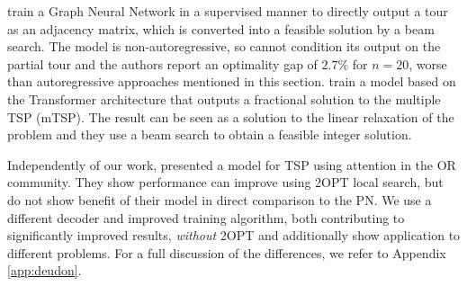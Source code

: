 \citet{nowak2017note} train a Graph Neural Network in a supervised manner to directly output a tour as an adjacency matrix, which is converted into a feasible solution by a beam search. The model is non-autoregressive, so cannot condition its output on the partial tour and the authors report an optimality gap of $2.7 \%$ for $n = 20$, worse than autoregressive approaches mentioned in this section. \citet{kaempfer2018learning} train a model based on the Transformer architecture \citep{vaswani2017attention} that outputs a fractional solution to the multiple TSP (mTSP). The result can be seen as a solution to the linear relaxation of the problem and they use a beam search to obtain a feasible integer solution. 

Independently of our work, \citet{deudon2018learning} presented a model for TSP using attention in the OR community. They show performance can improve using 2OPT local search, but do not show benefit of their model in direct comparison to the PN. We use a different decoder and improved training algorithm, both contributing to significantly improved results, \emph{without} 2OPT and additionally show application to different problems. For a full discussion of the differences, we refer to Appendix \ref{app:deudon}.